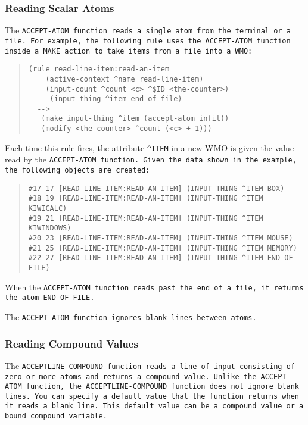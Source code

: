 \subsubsection{Reading Scalar Atoms}

The \tt{ACCEPT-ATOM} function reads a single atom
from the terminal or a file. For example, the
following rule uses the \tt{ACCEPT-ATOM} function
inside a \tt{MAKE} action to take items from a file
into a WMO:

\begin{quote}
\begin{verbatim}
(rule read-line-item:read-an-item
    (active-context ^name read-line-item)
    (input-count ^count <c> ^$ID <the-counter>)
    -(input-thing ^item end-of-file)
  -->
   (make input-thing ^item (accept-atom infil))
   (modify <the-counter> ^count (<c> + 1)))
\end{verbatim}
\end{quote}

Each time this rule fires, the attribute \verb|^ITEM| in a new WMO is
given the value read by the \tt{ACCEPT-ATOM} function. Given the data
shown in the example, the following objects are created:

\begin{quote}
\begin{verbatim}
#17 17 [READ-LINE-ITEM:READ-AN-ITEM] (INPUT-THING ^ITEM BOX)
#18 19 [READ-LINE-ITEM:READ-AN-ITEM] (INPUT-THING ^ITEM KIWICALC)
#19 21 [READ-LINE-ITEM:READ-AN-ITEM] (INPUT-THING ^ITEM KIWINDOWS)
#20 23 [READ-LINE-ITEM:READ-AN-ITEM] (INPUT-THING ^ITEM MOUSE)
#21 25 [READ-LINE-ITEM:READ-AN-ITEM] (INPUT-THING ^ITEM MEMORY)
#22 27 [READ-LINE-ITEM:READ-AN-ITEM] (INPUT-THING ^ITEM END-OF-FILE)
\end{verbatim}
\end{quote}

When the \tt{ACCEPT-ATOM} function reads past the end of a file, it
returns the atom \tt{END-OF-FILE}.

The \tt{ACCEPT-ATOM} function ignores blank lines between atoms.

\subsubsection{Reading Compound Values}

The \tt{ACCEPTLINE-COMPOUND} function reads a line of input consisting
of zero or more atoms and returns a compound value. Unlike the
\tt{ACCEPT-ATOM} function, the \tt{ACCEPTLINE-COMPOUND} function does
not ignore blank lines. You can specify a default value that the
function returns when it reads a blank line. This default value can be
a compound value or a bound compound variable.

